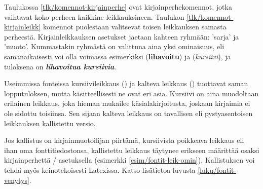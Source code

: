 
Taulukossa \ref{tlk/komennot-kirjainperhe} ovat kirjainperhekomennot,
jotka vaihtavat koko perheen kaikkine leikkauksineen. Taulukon
\ref{tlk/komennot-kirjainleikk} komennot puolestaan valitsevat toisen
leikkauksen samasta perheestä. Kirjainleikkauksen asetukset jaetaan
kahteen ryhmään:  'sarja' ja 
'muoto'. Kummastakin ryhmästä on valittuna aina yksi ominaisuus, eli
samanaikaisesti voi olla voimassa esimerkiksi 
(\textbf{lihavoitu}) ja  (\textit{kursiivi}), ja
tuloksena on \textbf{\itshape lihavoitua kursiivia}.

Useimmissa fonteissa kursiivileikkaus () ja kalteva
leikkaus () tuottavat saman lopputuloksen, mutta
käsitteellisesti ne ovat eri asia. Kursiivi on aina muodoltaan erilainen
leikkaus, joka hieman mukailee käsialakirjoitusta, joskaan kirjaimia ei
ole sidottu toisiinsa. Sen sijaan kalteva leikkaus on tavallisen eli
pystyasentoisen leikkauksen kallistettu versio.

Jos kallistus on kirjainmuotoilijan piirtämä, kursiivista poikkeava
leikkaus eli ihan oma fonttitiedostonsa, kallistettu leikkaus täytynee
erikseen määrittää osaksi kirjainperhettä \-/
asetuksella (esimerkki \ref{esim/fontit-leik-omin}). Kallistuksen voi
tehdä myös keinotekoisesti Latexissa. Katso lisätietoa luvusta
\ref{luku/fontit-venytys}.

